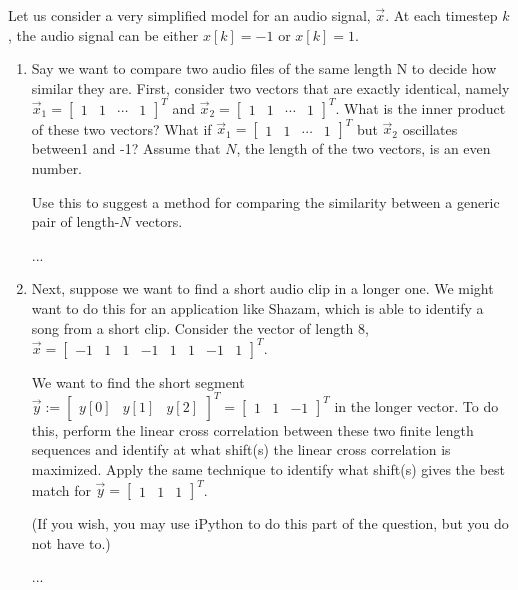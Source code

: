\documentclass[11pt]{article}
\begin{document}
\begin{enumerate}
	Let us consider a very simplified model for an audio signal, $\vec x$. At each timestep $k$, the audio signal can be either $x[k] = -1$ or $x[k] = 1$.
\begin{enumerate}
    \item Say we want to compare two audio files of the same length N to decide how similar they are. First, consider two vectors that are exactly identical, namely $\vec x_1 = \begin{bmatrix} 1 & 1 & \cdots & 1 \end{bmatrix}^T$ and $\vec x_2 = \begin{bmatrix} 1 &  1 & \cdots & 1 \end{bmatrix}^T$. What is the inner product of these two vectors? What if $\vec x_1 = \begin{bmatrix} 1 & 1 & \cdots & 1 \end{bmatrix}^T$ but $\vec x_2$ oscillates between1 and -1? Assume that $N$, the length of the two vectors, is an even number.
    
    Use this to suggest a method for comparing the similarity between a generic pair of length-$N$ vectors.
	    \begin{Answer}
	        ...
	    \end{Answer}

	\item Next, suppose we want to find a short audio clip in a longer one. We might want to do this for an application like Shazam, which is able to identify a song from a short clip. Consider the vector of length 8, $\vec x = \begin{bmatrix} -1 & 1 & 1 & -1 & 1 & 1 & -1 & 1\end{bmatrix}^T$.
    
    We want to find the short segment $\vec y := \begin{bmatrix} y[0] & y[1] & y[2] \end{bmatrix}^T = \begin{bmatrix} 1 & 1 & -1\end{bmatrix}^T$ in the longer vector. To do this, perform the linear cross correlation between these two finite length sequences and identify at what shift(s) the linear cross correlation is maximized. Apply the same technique to identify what shift(s) gives the best match for $\vec y = \begin{bmatrix} 1 & 1 & 1 \end{bmatrix}^T$.
    
    (If you wish, you may use iPython to do this part of the question, but you do not have to.)
	    \begin{Answer}
	        ...
	    \end{Answer}


\end{enumerate}
\end{enumerate}
\end{document}
